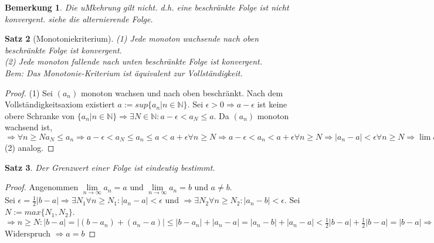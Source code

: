 \documentclass[a4paper,titlepage,oneside]{article}
\def\N{\ensuremath{\mathbb{N}} }
\def\toinf{\ensuremath{\rightarrow \infty}}
\theoremstyle{thmstyle}
\newtheorem{satz}{Satz}[subsection]
\newtheorem{bem}[satz]{Bemerkung}
\begin{document}
\begin{bem}
Die uMkehrung gilt nicht. d.h. eine beschränkte Folge ist nicht konvergent. siehe die alternierende Folge.
\end{bem}


\begin{satz}[Monotoniekriterium]
(1) Jede monoton wachsende nach oben beschränkte Folge ist konvergent.\\
(2) Jede monoton fallende nach unten beschränkte Folge ist konvergent.\\
Bem: Das Monotonie-Kriterium ist äquivalent zur Vollständigkeit.
\end{satz}
\begin{proof}
(1) Sei $(a_n)$ monoton wachsen und nach oben beschränkt. Nach dem Vollständigkeitsaxiom existiert $a := sup\{a_n | n \in \N\}$.
Sei $\epsilon > 0 \Rightarrow a - \epsilon$ ist keine obere Schranke von $\{a_n | n \in \N\} \Rightarrow \exists N \in \N : a-\epsilon < a_N \le a$. Da $(a_n)$ monoton wachsend ist, $ \Rightarrow \forall n \ge N a_N \le a_n \Rightarrow a-\epsilon < a_N \le a_n \le a < a+\epsilon \forall n \ge N \Rightarrow
a-\epsilon < a_n < a+\epsilon \forall n \ge N \Rightarrow |a_n - a| < \epsilon \forall n \ge N \Rightarrow \lim{a_k} = a.$
(2) analog.
\end{proof}

\begin{satz}
Der Grenzwert einer Folge ist eindeutig bestimmt.
\end{satz}
\begin{proof}
Angenommen $\lim\limits_{n \toinf}{a_n} = a$ und $\lim\limits_{n \toinf}{a_n} = b$ und $ a \ne b$.\\
Sei $\epsilon = \frac{1}{2}\left|b-a\right| \Rightarrow \exists N_1 \forall n \ge N_1 : |a_n - a| < \epsilon$ und $\Rightarrow \exists N_2 \forall n \ge N_2 : |a_n - b| < \epsilon$. Sei $N := max\{N_1, N_2\}$.\\
$\Rightarrow n \ge N : |b-a| = |(b-a_n) + (a_n - a)| \le |b - a_n| + |a_n - a| = |a_n - b| + |a_n - a| < \frac{1}{2}\left|b-a\right| + \frac{1}{2}\left|b-a\right| = |b-a|  \Rightarrow |b-a|  < |b-a| $ Widerspruch $\Rightarrow a = b$
\end{proof}
\end{document}
